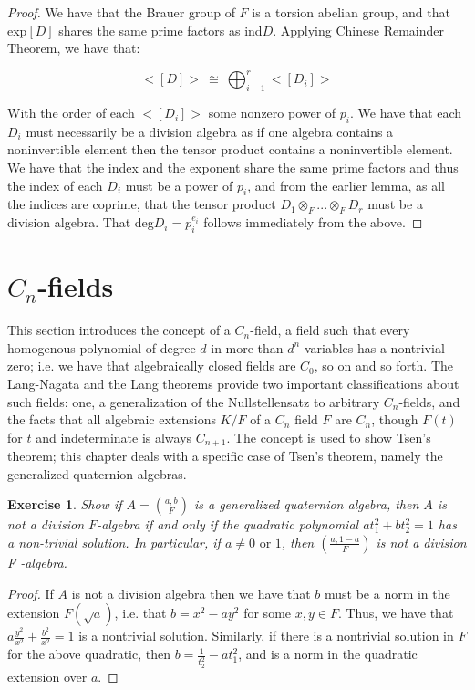 \documentclass{article}
\newtheorem{exercise}{Exercise}[section]
\begin{document}
\begin{proof}
  We have that the Brauer group of $F$ is a torsion abelian group, and that exp$[D]$ shares the same prime factors as ind$D$. Applying Chinese Remainder Theorem, we have that:

  \[
    <[D]> \ \cong \ \bigoplus_{i-1}^{r} <[D_{i}]>
  \]

  With the order of each $<[D_{i}]>$ some nonzero power of $p_{i}$. We have that each $D_{i}$ must necessarily be a division algebra as if one algebra contains a noninvertible element then the tensor product contains a noninvertible element. We have that the index and the exponent share the same prime factors and thus the index of each $D_{i}$ must be a power of $p_{i}$, and from the earlier lemma, as all the indices are coprime, that the tensor product $D_{1}\otimes_{F} ... \otimes_{F} D_{r}$ must be a division algebra. That deg$D_{i} = p_{i}^{e_{i}}$ follows immediately from the above. 
  \end{proof}
  \pagebreak


\section{$C_{n}$-fields}

This section introduces the concept of a $C_{n}$-field, a field such that every homogenous polynomial of degree $d$ in more than $d^{n}$ variables has a nontrivial zero; i.e. we have that algebraically closed fields are $C_{0}$, so on and so forth. The Lang-Nagata and the Lang theorems provide two important classifications about such fields: one, a generalization of the Nullstellensatz to arbitrary $C_{n}$-fields, and the facts that all algebraic extensions $K/F$ of a $C_{n}$ field $F$ are $C_{n}$, though $F(t)$ for $t$ and indeterminate is always $C_{n+1}$. The concept is used to show Tsen's theorem; this chapter deals with a specific case of Tsen's theorem, namely the generalized quaternion algebras.

\begin{exercise}
Show if $A = \left(\frac{a,b}{F}\right)$ is a generalized quaternion algebra, then $A$
is not a division $F$-algebra if and only if the quadratic polynomial
$at_{1}^{2} + bt_{2}^{2} = 1$ has a non-trivial solution. In particular, if $a \neq 0 \text{ or } 1$,
then $\left(\frac{a,1-a}{F}\right)$ is not a division F -algebra.
\end{exercise}

\begin{proof}
If $A$ is not a division algebra then we have that $b$ must be a norm in the extension $F(\sqrt{a})$, i.e. that $b = x^{2} - ay^{2}$ for some $x, y \in F$. Thus, we have that $a\frac{y^{2}}{x^{2}} + \frac{b^{2}}{x^{2}} = 1 $ is a nontrivial solution. Similarly, if there is a nontrivial solution in $F$ for the above quadratic, then $b = \frac{1}{t_{2}^{2}}- at_{1}^{2}$, and is a norm in the quadratic extension over $a$.  
  
  \end{proof}
\end{document}
